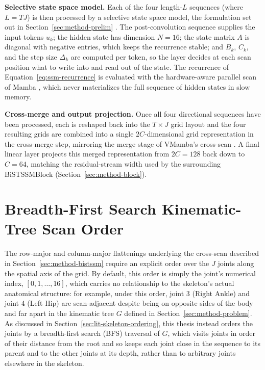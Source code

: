 \textbf{Selective state space model.} Each of the four length-$L$
sequences (where $L=TJ$) is then processed by a selective state space model,
the formulation set out in Section~\ref{sec:method-prelim}
\cite{gu2023mamba}. The post-convolution sequence supplies the input tokens
$u_k$; the hidden state has dimension $N=16$; the state matrix $A$ is diagonal
with negative entries, which keeps the recurrence stable; and $B_k$, $C_k$,
and the step size $\Delta_k$ are computed per token, so the layer decides at
each scan position what to write into and read out of the state. The
recurrence of Equation~\ref{eq:ssm-recurrence} is evaluated with the
hardware-aware parallel scan of Mamba \cite{gu2023mamba}, which never
materializes the full sequence of hidden states in slow memory.

\textbf{Cross-merge and output projection.} Once all four directional
sequences have been processed, each is reshaped back into the $T \times J$
grid layout and the four resulting grids are combined into a single
$2C$-dimensional grid representation in the cross-merge step, mirroring
the merge stage of VMamba's cross-scan \cite{liu2024vmamba}. A final linear
layer projects this merged representation from $2C=128$ back down to
$C=64$, matching the residual-stream width used by the surrounding
BiSTSSMBlock (Section~\ref{sec:method-block}).

\section{Breadth-First Search Kinematic-Tree Scan Order}
\label{sec:method-bfs}

The row-major and column-major flattenings underlying the cross-scan
described in Section~\ref{sec:method-bistssm} require an explicit order
over the $J$ joints along the spatial axis of the grid. By default, this
order is simply the joint's numerical index, $[0, 1, \ldots, 16]$, which
carries no relationship to the skeleton's actual anatomical structure: for
example, under this order, joint 3 (Right Ankle) and joint 4 (Left Hip)
are scan-adjacent despite being on opposite sides of the body and far
apart in the kinematic tree $G$ defined in
Section~\ref{sec:method-problem}. As discussed in
Section~\ref{sec:lit-skeleton-ordering}, this thesis instead orders the
joints by a breadth-first search (BFS) traversal of $G$, which visits
joints in order of their distance from the root and so keeps each joint
close in the sequence to its parent and to the other joints at its depth,
rather than to arbitrary joints elsewhere in the skeleton.

